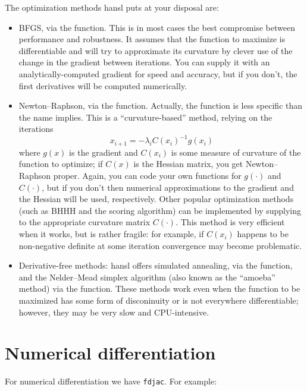 The optimization methods hansl puts at your disposal are:
\begin{itemize}
\item BFGS, via the  function. This is in most cases
  the best compromise between performance and robustness. It assumes
  that the function to maximize is differentiable and will try to
  approximate its curvature by clever use of the change in the
  gradient between iterations. You can supply it with an
  analytically-computed gradient for speed and accuracy, but if you
  don't, the first derivatives will be computed numerically.
\item Newton--Raphson, via the  function. Actually, the
  function is less specific than the name implies. This is a
  ``curvature-based'' method, relying on the iterations
  \[
    x_{i+1} = -\lambda_i C(x_i)^{-1} g(x_i)
  \]
  where $g(x)$ is the gradient and $C(x_i)$ is some measure of
  curvature of the function to optimize; if $C(x)$ is the Hessian
  matrix, you get Newton--Raphson proper. Again, you can code your own
  functions for $g(\cdot)$ and $C(\cdot)$, but if you don't then
  numerical approximations to the gradient and the Hessian will be
  used, respectively. Other popular optimization methods (such as BHHH
  and the scoring algorithm) can be implemented by supplying to
   the appropriate curvature matrix $C(\cdot)$. This
  method is very efficient when it works, but is rather fragile: for
  example, if $C(x_i)$ happens to be non-negative definite at some
  iteration convergence may become problematic.
\item Derivative-free methods: hansl offers simulated annealing, via
  the  function, and the Nelder--Mead simplex algorithm
  (also known as the ``amoeba'' method) via the  function.
  These methods work even when the function to be maximized has some
  form of disconinuity or is not everywhere differentiable; however,
  they may be very slow and CPU-intensive.
\end{itemize}

\section{Numerical differentiation}
\label{sec:hp-numdiff}

For numerical differentiation we have \texttt{fdjac}. For example:


